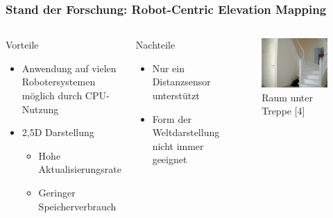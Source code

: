     \begin{frame}[t]
    \frametitle{Stand der Forschung: Robot-Centric Elevation Mapping}
      
      \begin{columns}[t]
      \column[]{6cm}
      \vspace{-0.5cm}
        
	\begin{exampleblock}{Vorteile}
	  \begin{itemize}
	    \item Anwendung auf vielen Robotersystemen möglich durch CPU-Nutzung
	    \item 2,5D Darstellung
	    \begin{itemize}
	    \item Hohe Aktualisierungsrate
	    \item Geringer Speicherverbrauch
	    \end{itemize} 

	  \end{itemize} 
	\end{exampleblock}
	
	\begin{alertblock}{Nachteile}
	\begin{itemize}
	  \item Nur ein Distanzsensor unterstützt
	  \item Form der Weltdarstellung nicht immer geeignet
	\end{itemize}

	\end{alertblock}
     
     \column{6cm}
      
       \begin{figure}[h]
 	\centering
 	    \includegraphics[width=\textwidth]{images/raum_unter_treppe}
 	\caption{Raum unter Treppe   [4]} 
       \end{figure}
  
    \end{columns}
     
    \end{frame}
    
